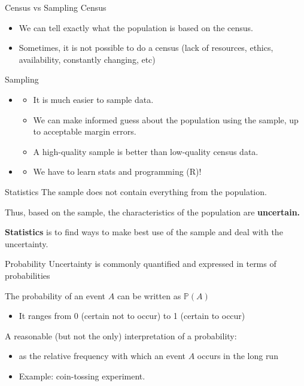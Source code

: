\documentclass{beamer}
\newcommand{\Pb}{\mathbb{P}}
\begin{document}
\begin{frame}{Census vs Sampling}
Census 
\begin{itemize}
\item[Pros] We can tell exactly what the population is based on the census. 
\item[Cons] Sometimes, it is not possible to do a census (lack of resources, ethics, availability, constantly changing, etc)
\end{itemize}


Sampling
\begin{itemize}
\item[Pros] \begin{itemize}
\item It is much easier to sample data. 
\item We can make informed guess about the population using the sample, up to acceptable margin errors. 
\item A high-quality sample is better than low-quality census data.  
\end{itemize}
\item[Cons] \begin{itemize}
\item[] We have to learn stats and programming (R)!
\end{itemize}
\end{itemize}
\end{frame}

\begin{frame}{Statistics}
The sample does not contain everything from the population. 

Thus, based on the sample, the characteristics of the population are {\bf uncertain.} 

{\bf Statistics} is to find ways to make best use of the
sample and deal with the uncertainty.
\end{frame}

\begin{frame}{Probability}
Uncertainty is commonly quantified and expressed in terms of
probabilities



The probability of an event $A$ can be written as $\Pb(A)$
\begin{itemize}
\item[$\rhd$] It ranges from 0 (certain not to occur) to 1 (certain to occur)
\end{itemize}



A reasonable (but not the only) interpretation of a probability:
\begin{itemize}
\item[$\rhd$] as the relative frequency with which an event $A$ occurs in the long run
\item[$\rhd$] Example: coin-tossing experiment. 
\end{itemize}



\end{frame}
\end{document}
